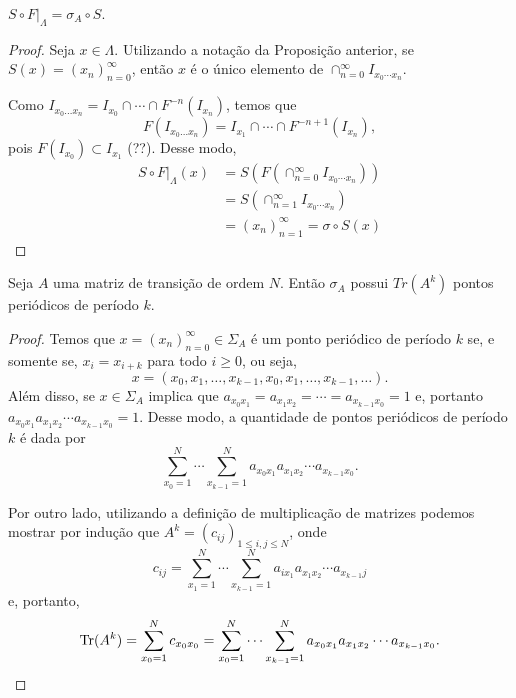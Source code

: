\begin{theorem}
$S \circ F|_\Lambda = \sigma_A \circ S$.
\end{theorem}


\begin{proof}
Seja $x \in \Lambda$. Utilizando a notação da Proposição anterior, se $S(x) = (x_n)_{n=0}^\infty$, então $x$ é o único elemento de $\cap_{n=0}^\infty I_{x_0 \cdots x_n}$.

Como $I_{x_0 \dots x_n} = I_{x_0} \cap \cdots \cap F^{-n}(I_{x_n})$, temos que
$$F(I_{x_0 \dots x_n}) = I_{x_1} \cap \cdots \cap F^{-n+1}(I_{x_n}),$$
pois $F(I_{x_0}) \subset I_{x_1}$ (??). Desse modo,
\begin{align*}
S \circ F|_{\Lambda}(x) & = S(F(\cap_{n=0}^\infty I_{x_0 \cdots x_n})) \\
& = S(\cap_{n=1}^\infty I_{x_0 \cdots x_n}) \\
& = (x_n)_{n=1}^\infty  = \sigma \circ S(x)
\end{align*}
\end{proof}


\begin{proposition}
Seja $A$ uma matriz de transição de ordem $N$. Então $\sigma_A$ possui $Tr(A^k)$ pontos periódicos de período $k$.
\end{proposition}


\begin{proof}
Temos que $x = (x_n)_{n=0}^\infty \in \Sigma_A$ é um ponto periódico de período $k$ se, e somente se, $x_i = x_{i+k}$ para todo $i \geq 0$, ou seja,
$$x = (x_0, x_1, \dots, x_{k-1}, x_0, x_1, \dots, x_{k-1}, \dots).$$
Além disso, se $x \in \Sigma_A$ implica que $a_{x_0 x_1} = a_{x_1 x_2} = \cdots = a_{x_{k-1} x_0} = 1$ e, portanto  $a_{x_0 x_1} a_{x_1 x_2}  \cdots a_{x_{k-1} x_0} = 1$. Desse modo, a quantidade de pontos periódicos de período $k$ é dada por
$$\sum_{x_0 = 1}^N \cdots \sum_{x_{k-1}=1}^N a_{x_0 x_1} a_{x_1 x_2}  \cdots a_{x_{k-1} x_0}.$$

Por outro lado, utilizando a definição de multiplicação de matrizes podemos mostrar por indução que $A^k = (c_{ij})_{1 \leq i, j \leq N}$, onde
$$c_{ij} = \sum_{x_1 = 1}^N \cdots \sum_{x_{k-1}=1}^N a_{i x_1} a_{x_1 x_2}  \cdots a_{x_{k-1}j}$$
e, portanto,
$$\operatorname{Tr}(A^k) = \sum_{x_0 = 1}^N c_{x_0 x_0} = \sum_{x_0 = 1}^N \cdots \sum_{x_{k-1}=1}^N a_{x_0 x_1} a_{x_1 x_2}  \cdots a_{x_{k-1} x_0}.$$
\end{proof}











